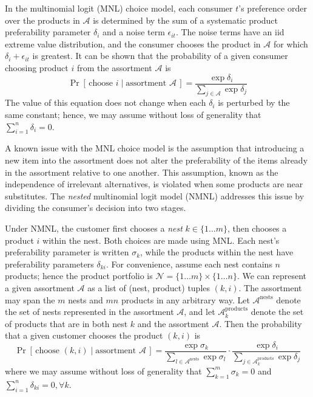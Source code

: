 \documentclass[preprint,12pt,authoryear]{elsarticle}
\begin{document}
In the multinomial logit (MNL) choice model, each consumer $t$'s preference order over the products in $\mathcal{A}$ is determined by the sum of a systematic product preferability parameter $\delta_i$ and a noise term $\epsilon_{it}$. The noise terms have an iid extreme value distribution, and the consumer chooses the product in $\mathcal{A}$ for which $\delta_i + \epsilon_{it}$ is greatest. It can be shown that the probability of a given consumer choosing product $i$ from the assortment $\mathcal{A}$ is
\begin{equation}\label{mnlchoiceprobability}
\operatorname{Pr}\left[\,\text{choose } i \;|\;\text{assortment }\mathcal{A}\,\right] =\frac{\exp \delta_i}{\sum_{j\in \mathcal{A}} \exp \delta_j}
\end{equation}
The value of this equation does not change when each $\delta_i$ is perturbed by the same constant; hence, we may assume without loss of generality that $\sum_{i=1}^n \delta_i = 0$.

A known issue with the MNL choice model is the assumption that introducing a new item into the assortment does not alter the preferability of the items already in the assortment relative to one another. This assumption, known as the independence of irrelevant alternatives, is violated when some products are near substitutes. The \emph{nested} multinomial logit model (NMNL) addresses this issue by dividing the consumer’s decision into two stages. 

Under NMNL, the customer first chooses a \emph{nest} $k \in \{ 1 \dots m\}$, then chooses a product $i$ within the nest. Both choices are made using MNL. Each nest's preferability parameter is written $\sigma_k$, while the products within the nest have preferability parameters $\delta_{ki}$. For convenience, assume each nest contains $n$ products; hence the product portfolio is $\mathcal{N} = \{1\dots m\} \times \{1\dots n\}$. We can represent a given assortment $\mathcal{A}$ as a list of (nest, product) tuples $(k, i)$. The assortment may span the $m$ nests and $mn$ products in any arbitrary way. Let $\mathcal{A}^{\text{nests}}$ denote the set of nests represented in the assortment $\mathcal{A}$, and let $\mathcal{A}_k^{\text{products}}$ denote the set of products that are in both nest $k$ and the assortment $\mathcal{A}$. Then the probability that a given customer chooses the product $(k, i)$ is
\begin{equation}\label{nmnlchoiceprobability}
\operatorname{Pr}\left[\,\text{choose } (k, i) \;|\;\text{assortment }\mathcal{A}\,\right] =\frac{\exp \sigma_k}{\sum_{l\in \mathcal{A}^{\text{nests}}} \exp \sigma_l} \cdot \frac{\exp \delta_i}{\sum_{j\in\mathcal{A}_{k}^{\text{products}}} \exp \delta_j}\end{equation}
where we may assume without loss of generality that $\sum_{k=1}^m \sigma_k = 0$ and $\sum_{i=1}^n \delta_{ki} = 0, \forall k$. 
\end{document}
